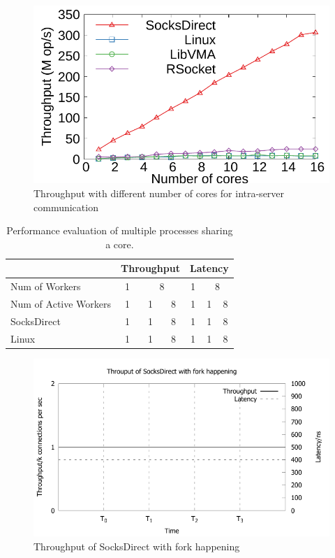 \begin{figure}[htpb]
	\centering
	\includegraphics[width=\columnwidth]{eval/microbenchmark/corenum-IPC-tput.pdf}
	\caption{Throughput with different number of cores for intra-server communication}
	\label{fig:eval-cornum-ipc}
\end{figure}

\begin{table}[t]
	\centering
		\begin{tabular}{l|c|c|c|c|c|c|}
			\hline
				& \multicolumn{3}{c|}{Throughput} & \multicolumn{3}{c|}{Latency} \\
			\hline
			Num of Workers	& \multicolumn{1}{c|}{1} & \multicolumn{2}{c|}{8} & \multicolumn{1}{c|}{1} & \multicolumn{2}{c|}{8} \\
			\hline
			Num of Active Workers	& 1 & 1 & 8 & 1 & 1 & 8 \\
			\hline
			\hline
			SocksDirect 	& 1 & 1 & 8 & 1 & 1 & 8 \\
			\hline
			Linux 	& 1 & 1 & 8 & 1 & 1 & 8 \\
			\hline
		\end{tabular}
	\caption{Performance evaluation of multiple processes sharing a core.}
	\label{tab:eval-context-switch}
\end{table}

\begin{figure}[htpb]
	\centering
	\includegraphics[width=\columnwidth]{eval/microbenchmark/fork-tput.pdf}
	\caption{Throughput of SocksDirect with fork happening}
	\label{fig:eval-fork-tput}
\end{figure}


